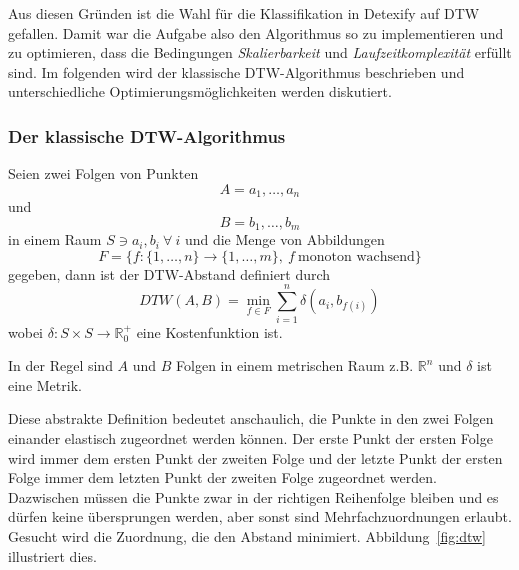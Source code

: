 Aus diesen Gründen ist die Wahl für die Klassifikation in Detexify auf DTW gefallen. Damit war die Aufgabe also den Algorithmus so zu implementieren und zu optimieren, dass die Bedingungen \emph{Skalierbarkeit} und \emph{Laufzeitkomplexität} erfüllt sind. Im folgenden wird der klassische DTW-Algorithmus beschrieben und unterschiedliche Optimierungsmöglichkeiten werden diskutiert.

\subsubsection{Der klassische DTW-Algorithmus} %
\label{ssub:der_klassische_dtw_algorithmus}

Seien zwei Folgen von Punkten
\begin{equation*}
  A = a_1, \dots, a_n
\end{equation*}
und
\begin{equation*}
  B = b_1, \dots, b_m
\end{equation*}
in einem Raum \( S \ni a_i, b_i ~\forall~i \) und die Menge von Abbildungen
\begin{equation*}
  F = \{f:\{1,\dots,n\} \rightarrow \{1,\dots,m\}, ~f~\text{monoton wachsend} \}  
\end{equation*}
gegeben, dann ist der DTW-Abstand definiert durch
\begin{equation}
  \label{eqn:dtw}
  DTW(A,B) = \min_{f \in F}{\sum_{i=1}^{n}{\delta(a_i,b_{f(i)})}}  
\end{equation}
wobei \( \delta : S\times S \rightarrow \mathbb{R}_0^+ \) eine Kostenfunktion ist.

In der Regel sind \(A\) und \(B\) Folgen in einem metrischen Raum z.B. \(\mathbb{R}^n\) und \(\delta\) ist eine Metrik.

Diese abstrakte Definition bedeutet anschaulich, die Punkte in den zwei Folgen einander elastisch zugeordnet werden können. Der erste Punkt der ersten Folge wird immer dem ersten Punkt der zweiten Folge und der letzte Punkt der ersten Folge immer dem letzten Punkt der zweiten Folge zugeordnet werden. Dazwischen müssen die Punkte zwar in der richtigen Reihenfolge bleiben und es dürfen keine übersprungen werden, aber sonst sind Mehrfachzuordnungen erlaubt. Gesucht wird die Zuordnung, die den Abstand minimiert. Abbildung~\ref{fig:dtw} illustriert dies.

